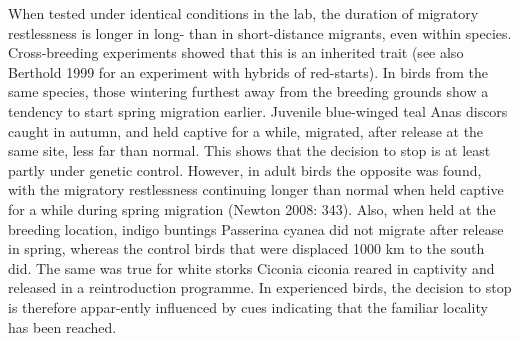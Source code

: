 \documentclass[
]{book}
\begin{document}
When tested under identical conditions in the lab, the duration of migratory restlessness is longer in long- than in short-distance migrants, even within species. Cross-breeding experiments showed that this is an inherited trait (see also Berthold 1999 for an experiment with hybrids of red-starts). In birds from the same species, those wintering furthest away from the breeding grounds show a tendency to start spring migration earlier. Juvenile blue-winged teal Anas discors caught in autumn, and held captive for a while, migrated, after release at the same site, less far than normal. This shows that the decision to stop is at least partly under genetic control. However, in adult birds the opposite was found, with the migratory restlessness continuing longer than normal when held captive for a while during spring migration (Newton 2008: 343). Also, when held at the breeding location, indigo buntings Passerina cyanea did not migrate after release in spring, whereas the control birds that were displaced 1000 km to the south did. The same was true for white storks Ciconia ciconia reared in captivity and released in a reintroduction programme. In experienced birds, the decision to stop is therefore appar-ently influenced by cues indicating that the familiar locality has been reached.
\end{document}
